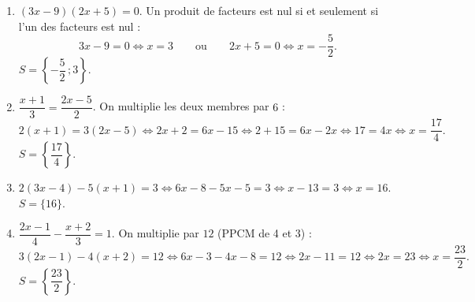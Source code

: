 \documentclass[11pt]{article}
\begin{document}
\begin{corrige}
\begin{enumerate}
    \item $(3x - 9)(2x + 5) = 0$. Un produit de facteurs est nul si et seulement si l'un des facteurs est nul :
    \[ 3x - 9 = 0 \iff x = 3 \qquad \text{ou} \qquad 2x + 5 = 0 \iff x = -\dfrac{5}{2}. \]
    $S = \left\{-\dfrac{5}{2}\,; 3\right\}$.
    \item $\dfrac{x + 1}{3} = \dfrac{2x - 5}{2}$. On multiplie les deux membres par $6$ :
    \[ 2(x + 1) = 3(2x - 5) \iff 2x + 2 = 6x - 15 \iff 2 + 15 = 6x - 2x \iff 17 = 4x \iff x = \dfrac{17}{4}. \]
    $S = \left\{\dfrac{17}{4}\right\}$.
    \item $2(3x - 4) - 5(x + 1) = 3 \iff 6x - 8 - 5x - 5 = 3 \iff x - 13 = 3 \iff x = 16$. \quad $S = \{16\}$.
    \item $\dfrac{2x - 1}{4} - \dfrac{x + 2}{3} = 1$. On multiplie par $12$ (PPCM de 4 et 3) :
    \[ 3(2x - 1) - 4(x + 2) = 12 \iff 6x - 3 - 4x - 8 = 12 \iff 2x - 11 = 12 \iff 2x = 23 \iff x = \dfrac{23}{2}. \]
    $S = \left\{\dfrac{23}{2}\right\}$.
\end{enumerate}
\end{corrige}
\end{document}

